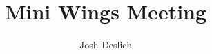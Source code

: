 \documentclass[10pt, aspectratio=169]{beamer}
\title{Mini Wings Meeting}
\author{Josh Deslich}
\begin{document}
\titlepage





\end{document}
